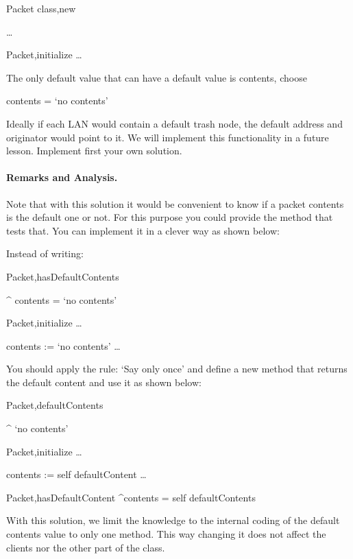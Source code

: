\begin{scode}
Packet class\sep{}new

\dots 

Packet\sep{}initialize
   \dots 
\end{scode}

The only default value that can have a default value is contents, 
choose 

\begin{scode}
contents = `no contents'
\end{scode} 


Ideally if each LAN would contain a default trash node, the default 
address and originator would point to it. We will implement this 
functionality in a future lesson. Implement first your own solution. 


\paragraph{Remarks and Analysis.} Note that with this solution it would be convenient to know if a packet contents is the default one or not. For this purpose you could provide the method  that tests that. You can implement it in a clever way as shown below:

Instead of writing:

\begin{scode}
Packet\sep{}hasDefaultContents
 
 ^ contents = `no contents'

Packet\sep{}initialize
 \dots 

contents := `no contents'
\dots 
\end{scode}

You should apply the rule: `Say only once' and define a new method 
that returns the default content and use it as shown below:

\begin{scode}
Packet\sep{}defaultContents

    ^ `no contents'

Packet\sep{}initialize
    \dots 

    contents := self defaultContent
    \dots 

Packet\sep{}hasDefaultContent
    ^contents = self defaultContents
\end{scode}

With this solution, we limit the knowledge to the internal coding of the default contents value to only one method. This way changing it does not affect the clients nor the other part of the class. 

